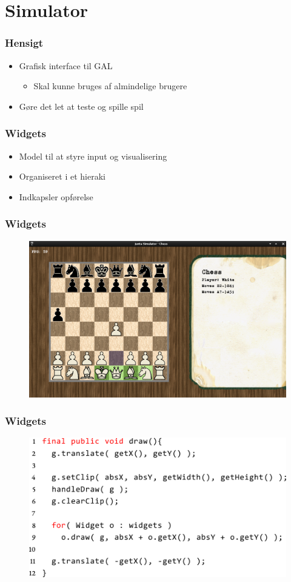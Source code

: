 \section{Simulator}

\begin{frame}
  \frametitle{Hensigt}

  \begin{itemize}
    \item Grafisk interface til GAL
	   \begin{itemize}
		  \item Skal kunne bruges af almindelige brugere
	   \end{itemize}
	 \item Gøre det let at teste og spille spil
  \end{itemize}
\end{frame}

\begin{frame}
  \frametitle{Widgets}

  \begin{itemize}
    \item Model til at styre input og visualisering
	 \item Organiseret i et hieraki
	 \item Indkapsler opførelse
  \end{itemize}
\end{frame}

\begin{frame}
  \frametitle{Widgets}

 	\begin{figure}
    	\includegraphics[width=0.8\linewidth]{billeder/simulator.png}
 	\end{figure}
\end{frame}

\begin{frame}
  \frametitle{Widgets}

 	\begin{figure}
    	\includegraphics[width=0.8\linewidth]{billeder/widgets_draw_code.png}
 	\end{figure}
\end{frame}
